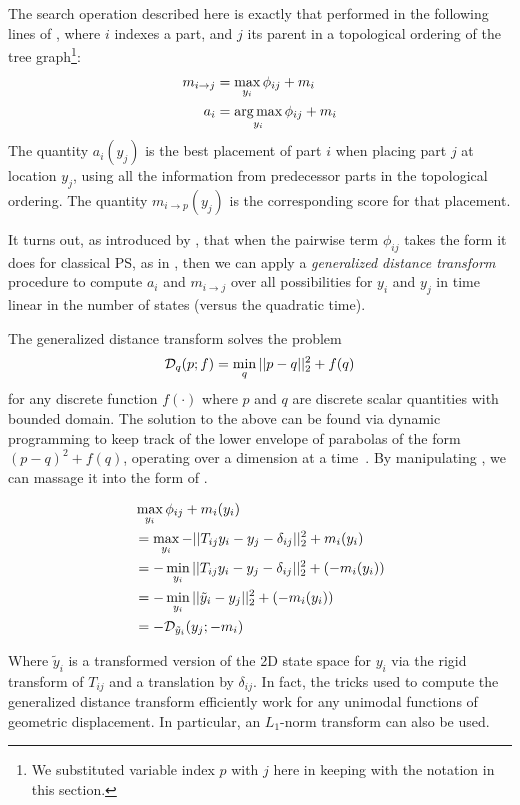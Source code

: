 The search operation described here is exactly that performed in the following 
lines of , where $i$ indexes a part, and $j$ its parent 
in a topological ordering of the tree graph\footnote{We substituted variable 
index $p$ with $j$ here in keeping with the notation in this section.}:
\begin{align}
\label{eq:pairwise-max}
m_{i \rightarrow j} &= \max_{y_i} \phi_{ij} + m_i\\
a_i &= \mathop{\arg\max}_{y_i} \phi_{ij} + m_i
\end{align}
The quantity $a_i(y_j)$ is the best placement of part $i$ when placing part $j$ 
at location $y_j$, using all the information from predecessor parts in the 
topological ordering.  The quantity $m_{i \rightarrow p}(y_j)$ is the 
corresponding score for that placement.  

It turns out, as introduced by \citet{felz05}, that when the pairwise term 
$\phi_{ij} $ takes the form it does for classical PS, as in 
, then we can apply a {\em generalized distance transform} 
procedure to compute $a_i$ and $m_{i \rightarrow j}$ over all possibilities for 
$y_i$ and $y_j$ in time linear in the number of states (versus the \naive 
quadratic time).

The generalized distance transform solves the problem
\begin{align}
\label{eq:dt-prob}
\mathcal{D}_q(p; f) = \min_q ||p-q||_2^2 + f(q)
\end{align}
for any discrete function $f(\cdot)$ where $p$ and $q$ are discrete scalar 
quantities with bounded domain.  The solution to the above can be found via 
dynamic programming to keep track of the lower envelope of parabolas of the 
form $(p-q)^2 + f(q)$, operating over a dimension at a time~\citep{felz-dt}.  
By manipulating , we can massage it into the form of 
.

\begin{align}
&\max_{y_i} \phi_{ij} + m_i(y_i)\\
&= \max_{y_i} -||T_{ij}y_i - y_j - \delta_{ij}||_2^2 + m_i(y_i) \\
&= -\min_{y_i} ||T_{ij}y_i - y_j - \delta_{ij}||_2^2 + (-m_i(y_i)) \\
&= -\min_{y_i} ||\tilde{y}_i - y_j||_2^2 + (-m_i(y_i)) \\
&= -\mathcal{D}_{\tilde{y}_i}(y_j; -m_i)
\end{align}

Where $\tilde{y}_i$ is a transformed version of the 2D state space for $y_i$ 
via the rigid transform of $T_{ij}$ and a translation by $\delta_{ij}$. In 
fact, the tricks used to compute the generalized distance transform efficiently 
work for any unimodal functions of geometric displacement.  In particular, an 
$L_1$-norm transform can also be used. 

